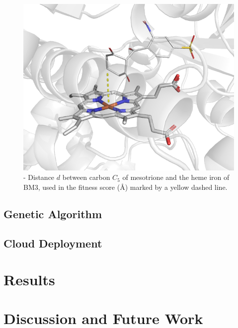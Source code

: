 \documentclass[16pt]{article}
\begin{document}
\begin{figure}
	\includegraphics[width=\textwidth]{img/score.png}
	\caption{\label{score} - Distance $d$  between carbon $C_5$ of mesotrione and the heme iron of BM3, used in the fitness score (\AA) marked by a yellow dashed line.}
\end{figure}

\subsection{Genetic Algorithm \label{ga}}
\subsection{Cloud Deployment \label{cloud}}
\section{Results}

\section{Discussion and Future Work}


\printbibliography
\end{document}
